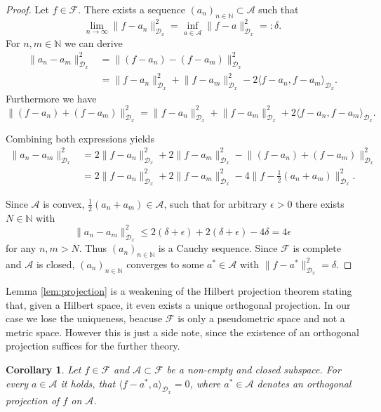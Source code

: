 \documentclass[11pt, a4paper]{article}
\newtheorem{corollary}[theorem]{Corollary}
\newcommand{\N}{\mathds{N}}
\newcommand{\A}{\mathcal{A}}
\newcommand{\D}{\mathcal{D}}
\newcommand{\F}{\mathcal{F}}
\begin{document}
\begin{proof}
Let $f \in \F$. There exists a sequence $(a_n)_{n \in \N} \subset \A$ such that
\[ \lim_{n \to \infty} \big \| f - a_n \big \|_{\D_x}^2 = \inf_{a \in \A} \big \| f - a \big \|_{\D_x}^2 =: \delta. \]
For $n,m \in \N$ we can derive
\[ \begin{split}
\big \| a_n - a_m \big \|_{\D_x}^2 
&= \big \| (f-a_n) - (f-a_m) \big \|_{\D_x}^2 \\\
&= \big \| f - a_n \big \|_{\D_x}^2 + \big \| f - a_m \big \|_{\D_x}^2 - 2 \big \langle f-a_n, f-a_m \big \rangle_{\D_x}.
\end{split} \]
Furthermore we have
\[ \big \| (f-a_n) + (f-a_m) \big \|_{\D_x}^2 = \big \| f - a_n \big \|_{\D_x}^2 + \big \| f - a_m \big \|_{\D_x}^2 + 2 \big \langle f-a_n, f-a_m \big \rangle_{\D_x}. \]

Combining both expressions yields
\[ \begin{split}
\big \| a_n - a_m \big \|_{\D_x}^2 
&= 2 \big \| f - a_n \big \|_{\D_x}^2 + 2 \big \| f - a_m \big \|_{\D_x}^2 - \big \| (f-a_n) + (f-a_m) \big \|_{\D_x}^2 \\\
&= 2 \big \| f - a_n \big \|_{\D_x}^2 + 2 \big \| f - a_m \big \|_{\D_x}^2 - 4 \big \| f - \frac{1}{2}(a_n+a_m) \big \|_{\D_x}^2.
\end{split} \]

Since $\A$ is convex, $\frac{1}{2}(a_n + a_m) \in \A$, such that for arbitrary $\epsilon > 0$ there exists $N \in \N$ with 
\[ \big \| a_n - a_m \big \|_{\D_x}^2 \leq 2(\delta + \epsilon) + 2(\delta + \epsilon) - 4\delta = 4\epsilon \]
for any $n,m > N$. Thus $(a_n)_{n \in \N}$ is a Cauchy sequence. Since $\F$ is complete and $\A$ is closed, $(a_n)_{n \in \N}$ converges to some $a^* \in \A$ with $\big \| f - a^* \big \|_{\D_x}^2 = \delta$.
\end{proof}

Lemma \ref{lem:projection} is a weakening of the Hilbert projection theorem stating that, given a Hilbert space, it even exists a unique orthogonal projection. In our case we lose the uniqueness, beacuse $\F$ is only a pseudometric space and not a metric space. However this is just a side note, since the existence of an orthogonal projection suffices for the further theory.

\begin{corollary} \label{cor:projection}
Let $f \in \F$ and $\A \subset \F$ be a non-empty and closed subspace. For every $a \in \A$ it holds, that $\langle f - a^* , a \rangle_{\D_x} = 0$, where $a^* \in \A$ denotes an orthogonal projection of $f$ on $\A$.
\end{corollary}
\end{document}
